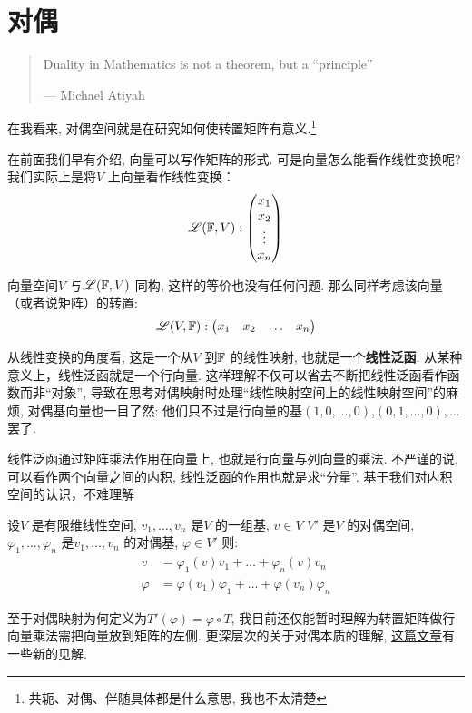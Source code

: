 \section{对偶}

\begin{quote}
    Duality in Mathematics is not a theorem, but a ``principle''

    \hfill --- Michael Atiyah
\end{quote}

在我看来, 对偶空间就是在研究如何使转置矩阵有意义.\footnote{共轭、对偶、伴随具体都是什么意思,
我也不太清楚}

在前面我们早有介绍, 向量可以写作矩阵的形式. 可是向量怎么能看作线性变换呢? 我们实际上是将\(V\)
上向量看作线性变换：\[
    \mathscr{L}(\mathbb{F},V):
    \begin{pmatrix}
        x_1 \\
        x_2 \\
        \vdots \\
        x_n
    \end{pmatrix}
\]

向量空间\(V\) 与\(\mathscr{L}(\mathbb{F},V)\) 同构, 这样的等价也没有任何问题.
那么同样考虑该向量（或者说矩阵）的转置:
\[
    \mathscr{L}(V,\mathbb{F}):
    \begin{pmatrix}
        x_1 & x_2 & \dots & x_n
    \end{pmatrix}
\]

从线性变换的角度看, 这是一个从\(V\) 到\(\mathbb{F}\) 的线性映射, 也就是一个\textbf{线性泛函}.
从某种意义上，线性泛函就是一个行向量. 这样理解不仅可以省去不断把线性泛函看作函数而非``对象'',
导致在思考对偶映射时处理``线性映射空间上的线性映射空间''的麻烦, 对偶基向量也一目了然:
他们只不过是行向量的基\((1,0,\dots ,0)\),\((0,1,\dots ,0),\dots \) 罢了.

线性泛函通过矩阵乘法作用在向量上, 也就是行向量与列向量的乘法. 不严谨的说, 可以看作两个向量之间的内积,
线性泛函的作用也就是求``分量''. 基于我们对内积空间的认识，不难理解
\begin{theorem}
    设\(V\) 是有限维线性空间, \(v_{1}, \dots ,v_{n}\) 是\(V\) 的一组基, \(v \in V\)
    \(V'\) 是\(V\) 的对偶空间, \(\varphi_{1}, \dots ,\varphi_{n}\)
    是\(v_{1}, \dots ,v_{n}\) 的对偶基, \(\varphi \in V'\)
    则:
    \begin{align*}
        v &= \varphi_{1}(v)v_{1} + \dots + \varphi_{n}(v)v_{n} \\
        \varphi &= \varphi(v_{1})\varphi_{1} + \dots +
        \varphi(v_{n})\varphi_{n}
    \end{align*}
\end{theorem}

至于对偶映射为何定义为\(T'(\varphi)=\varphi \circ T\),
我目前还仅能暂时理解为转置矩阵做行向量乘法需把向量放到矩阵的左侧. 更深层次的关于对偶本质的理解,
\href{https://www.zhihu.com/question/38464481/answer/2110009942}{这篇文章}有一些新的见解.